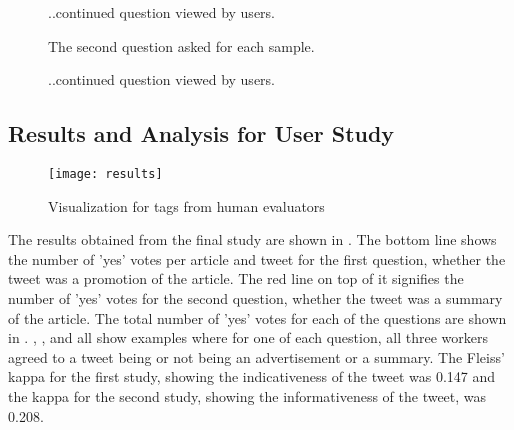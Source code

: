 \begin{figure}[!htbp]
  \ContinuedFloat 
  \centering 
  \subfloat{\texttt{[image: q12]}}%
  \caption[]{..continued question viewed by users.}
  \label{fig:q12}
\end{figure} 

\begin{figure}[!htbp]
  \centering 
  \subfloat{\texttt{[image: q21]}}
  \caption[User study question 2 example]{The second question asked for each sample.}
  \label{fig:q2}
\end{figure}

\begin{figure}[!htbp]
  \ContinuedFloat 
  \centering 
  \subfloat{\texttt{[image: q22]}}%
  \caption[]{..continued question viewed by users.}
  \label{fig:q22}
\end{figure} 


\subsection{Results and Analysis for User Study}

\begin{figure}[!htbp]
\centering
\texttt{[image: results]}
\caption[Results from user study]{Visualization for tags from human evaluators}
\label{fig:res}
\end{figure}

The results obtained from the final study are shown in . The bottom line shows the number of 'yes' votes per article and tweet for the first question, whether the tweet was a promotion of the article. The red line on top of it signifies the number of 'yes' votes for the second question, whether the tweet was a summary of the article. The total number of 'yes' votes for each of the questions are shown in . , ,  and  all show examples where for one of each question, all three workers agreed to a tweet being or not being an advertisement or a summary. The Fleiss' kappa for the first study, showing the indicativeness of the tweet was 0.147 and the kappa for the second study, showing the informativeness of the tweet, was 0.208.

